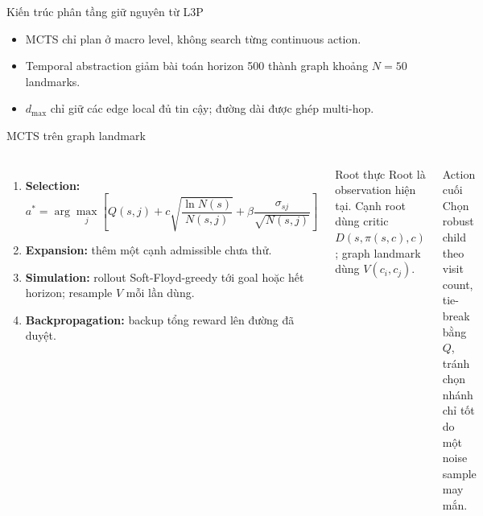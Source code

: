 \documentclass[aspectratio=169,10pt]{beamer}
\begin{document}
\begin{frame}{Kiến trúc phân tầng giữ nguyên từ L3P}
  \centering

  \vspace{0.8em}
  \begin{itemize}
    \item MCTS chỉ plan ở macro level, không search từng continuous action.
    \item Temporal abstraction giảm bài toán horizon 500 thành graph khoảng
          $N=50$ landmarks.
    \item $d_{\max}$ chỉ giữ các edge local đủ tin cậy; đường dài được ghép multi-hop.
  \end{itemize}
\end{frame}

\begin{frame}{MCTS trên graph landmark}
  \begin{columns}[T]
      \begin{enumerate}
        \item \textbf{Selection:}
        \[
          a^*=\arg\max_j\left[
          Q(s,j)+c\sqrt{\frac{\ln N(s)}{N(s,j)}}
          +\beta\frac{\sigma_{sj}}{\sqrt{N(s,j)}}\right]
        \]
        \item \textbf{Expansion:} thêm một cạnh admissible chưa thử.
        \item \textbf{Simulation:} rollout Soft-Floyd-greedy tới goal hoặc hết horizon;
              resample $V$ mỗi lần dùng.
        \item \textbf{Backpropagation:} backup tổng reward lên đường đã duyệt.
      \end{enumerate}
      \begin{block}{Root thực}
        Root là observation hiện tại. Cạnh root dùng critic
        $D(s,\pi(s,c),c)$; graph landmark dùng $V(c_i,c_j)$.
      \end{block}
      \begin{block}{Action cuối}
        Chọn robust child theo visit count, tie-break bằng $Q$, tránh chọn nhánh
        chỉ tốt do một noise sample may mắn.
      \end{block}
  \end{columns}
\end{frame}
\end{document}
